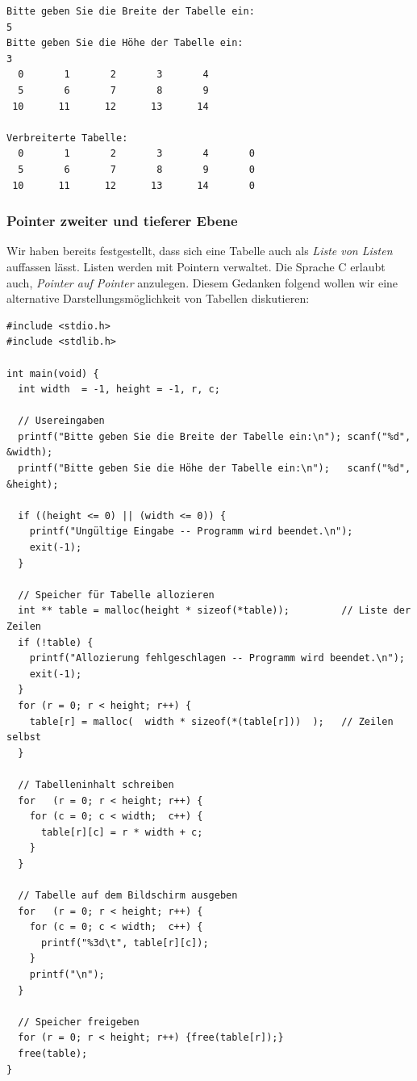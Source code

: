 \begin{cmdbox}
\begin{verbatim}
Bitte geben Sie die Breite der Tabelle ein:
5
Bitte geben Sie die Höhe der Tabelle ein:
3
  0       1       2       3       4
  5       6       7       8       9
 10      11      12      13      14

Verbreiterte Tabelle:
  0       1       2       3       4       0
  5       6       7       8       9       0
 10      11      12      13      14       0
\end{verbatim}
\end{cmdbox}

\subsubsection{Pointer zweiter und tieferer Ebene}
Wir haben bereits festgestellt, dass sich eine Tabelle auch als \emph{Liste von Listen} auffassen lässt. Listen werden mit Pointern verwaltet. Die Sprache C erlaubt auch, \emph{Pointer auf Pointer} anzulegen. Diesem Gedanken folgend wollen wir eine alternative Darstellungsmöglichkeit von Tabellen diskutieren:

\begin{codebox}
\begin{verbatim}
#include <stdio.h>
#include <stdlib.h>
 
int main(void) {
  int width  = -1, height = -1, r, c;
  
  // Usereingaben
  printf("Bitte geben Sie die Breite der Tabelle ein:\n"); scanf("%d", &width);
  printf("Bitte geben Sie die Höhe der Tabelle ein:\n");   scanf("%d", &height);
  
  if ((height <= 0) || (width <= 0)) {
    printf("Ungültige Eingabe -- Programm wird beendet.\n");
    exit(-1);
  }
  
  // Speicher für Tabelle allozieren
  int ** table = malloc(height * sizeof(*table));         // Liste der Zeilen
  if (!table) {
    printf("Allozierung fehlgeschlagen -- Programm wird beendet.\n");
    exit(-1);
  }
  for (r = 0; r < height; r++) {
    table[r] = malloc(  width * sizeof(*(table[r]))  );   // Zeilen selbst
  }
  
  // Tabelleninhalt schreiben
  for   (r = 0; r < height; r++) {
    for (c = 0; c < width;  c++) {
      table[r][c] = r * width + c;
    }
  }
  
  // Tabelle auf dem Bildschirm ausgeben
  for   (r = 0; r < height; r++) {
    for (c = 0; c < width;  c++) {
      printf("%3d\t", table[r][c]);
    }
    printf("\n");
  }
  
  // Speicher freigeben
  for (r = 0; r < height; r++) {free(table[r]);}
  free(table);
}
\end{verbatim}
\end{codebox}

